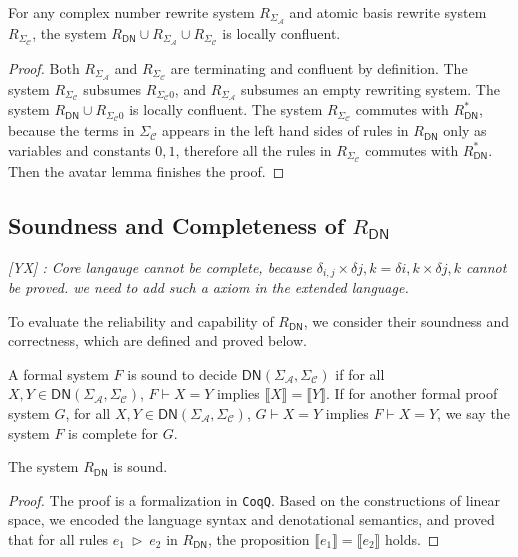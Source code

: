 \documentclass[manuscript, review, timestamp]{acmart}
\newcommand{\yx}[1]{\textit{\color{blue}[YX] : #1}}
\newcommand*{\reduce}{\ \triangleright\ }
\newcommand*{\sem}[1]{{\llbracket #1 \rrbracket}}
\begin{document}
\begin{theorem}
  For any complex number rewrite system $R_{\Sigma_\mathcal{A}}$ and atomic basis rewrite system $R_{\Sigma_\mathcal{C}}$, the system $R_\textsf{DN} \cup R_{\Sigma_\mathcal{A}} \cup R_{\Sigma_\mathcal{C}}$ is locally confluent.
\end{theorem}
\begin{proof}
  Both $R_{\Sigma_\mathcal{A}}$ and $R_{\Sigma_\mathcal{C}}$ are terminating and confluent by definition. 
  The system $R_{\Sigma_\mathcal{C}}$ subsumes $R_{\Sigma_\mathcal{C}0}$, and $R_{\Sigma_\mathcal{A}}$ subsumes an empty rewriting system. 
  The system $R_\textsf{DN} \cup R_{\Sigma_\mathcal{C}0}$ is locally confluent. 
  The system $R_{\Sigma_\mathcal{C}}$ commutes with $R_\textsf{DN}^*$, because the terms in $\Sigma_\mathcal{C}$ appears in the left hand sides of rules in $R_\textsf{DN}$ only as variables and constants $0, 1$, therefore all the rules in $R_{\Sigma_\mathcal{C}}$ commutes with $R_\textsf{DN}^*$. 
  Then the avatar lemma finishes the proof.
\end{proof}

\subsection{Soundness and Completeness of $R_\textsf{DN}$}

\yx{Core langauge cannot be complete, because $\delta_{i,j} \times \delta{j,k} = \delta{i, k} \times \delta{j, k}$ cannot be proved. we need to add such a axiom in the extended language.}

To evaluate the reliability and capability of $R_\textsf{DN}$, we consider their soundness and correctness, which are defined and proved below.

\begin{definition}
  A formal system $F$ is sound to decide $\textsf{DN}(\Sigma_\mathcal{A}, \Sigma_\mathcal{C})$ if for all $X, Y \in \textsf{DN}(\Sigma_\mathcal{A}, \Sigma_\mathcal{C})$, $F \vdash X = Y$ implies $\sem{X} = \sem{Y}$. If for another formal proof system $G$, for all $X, Y \in \textsf{DN}(\Sigma_\mathcal{A}, \Sigma_\mathcal{C})$, $G \vdash X = Y$ implies $F \vdash X = Y$, we say the system $F$ is complete for $G$.
\end{definition}

\begin{lemma}
  The system $R_\textsf{DN}$ is sound.
\end{lemma}
\begin{proof}
  The proof is a formalization in \texttt{CoqQ}. Based on the constructions of linear space, we encoded the language syntax and denotational semantics, and proved that for all rules $e_1 \reduce e_2$ in $R_\textsf{DN}$, the proposition $\sem{e_1} = \sem{e_2}$ holds.
\end{proof}
\end{document}
